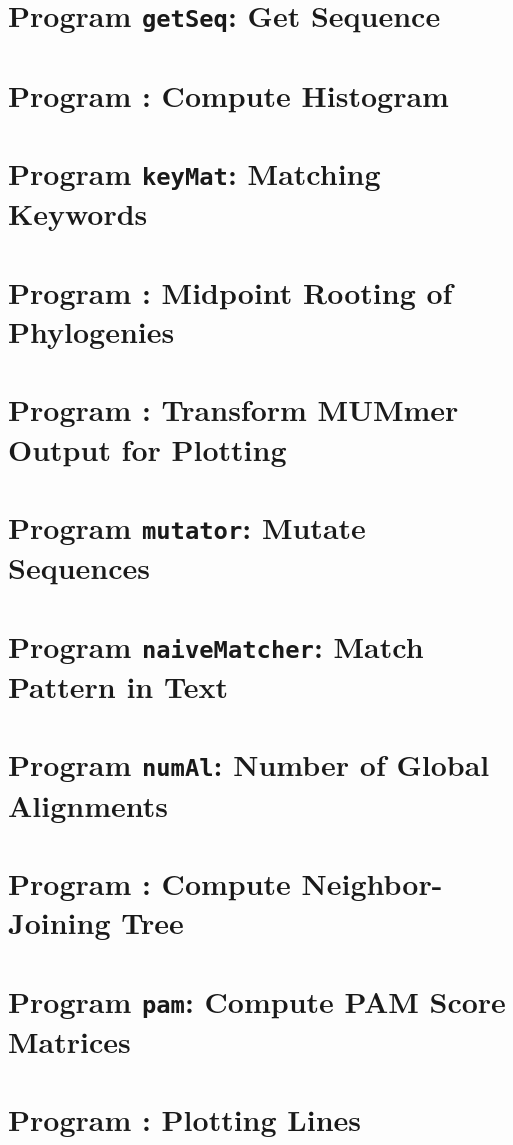 \documentclass[a4paper]{report}
\begin{document}
\chapter{Program \texttt{getSeq}: Get Sequence}\label{ch:get}

\chapter{Program : Compute Histogram}\label{ch:his}

\chapter{Program \texttt{keyMat}: Matching Keywords}\label{ch:km}

\chapter{Program : Midpoint Rooting of
  Phylogenies}\label{ch:mr}

\chapter{Program : Transform MUMmer Output for
  Plotting}\label{ch:m2p}

\chapter{Program \texttt{mutator}: Mutate Sequences}\label{ch:mut}

\chapter{Program \texttt{naiveMatcher}: Match Pattern in
  Text}\label{ch:nm}

\chapter{Program \texttt{numAl}: Number of Global
  Alignments}\label{ch:num}

\chapter{Program : Compute Neighbor-Joining Tree}\label{ch:nj}

\chapter{Program \texttt{pam}: Compute PAM Score
  Matrices}\label{ch:pam}

\chapter{Program : Plotting Lines}\label{ch:pl}

\end{document}
